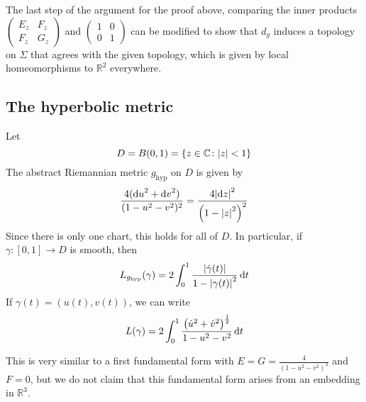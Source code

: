 \begin{remark}
	The last step of the argument for the proof above, comparing the inner products \( \begin{pmatrix}
		E_z & F_z \\
		F_z & G_z
	\end{pmatrix} \) and \( \begin{pmatrix}
		1 & 0 \\
		0 & 1
	\end{pmatrix} \) can be modified to show that \( d_g \) induces a topology on \( \Sigma \) that agrees with the given topology, which is given by local homeomorphisms to \( \mathbb R^2 \) everywhere.
\end{remark}

\subsection{The hyperbolic metric}
\begin{definition}
	Let
	\[ D = B(0,1) = \qty{z \in \mathbb C \colon \abs{z} < 1} \]
	The abstract Riemannian metric \( g_{\mathrm{hyp}} \) on \( D \) is given by
	\[ \frac{4(\dd{u}^2 + \dd{v}^2)}{(1-u^2-v^2)^2} = \frac{4 \abs{\dd{z}}^2}{\qty(1 - \abs{z}^2)^2} \]
	Since there is only one chart, this holds for all of \( D \).
	In particular, if \( \gamma \colon [0,1] \to D \) is smooth, then
	\[ L_{g_{\mathrm{hyp}}}(\gamma) = 2 \int_0^1 \frac{\abs{\dot\gamma(t)}}{1 - \abs{\gamma(t)}^2} \dd{t} \]
	If \( \gamma(t) = (u(t), v(t)) \), we can write
	\[ L(\gamma) = 2 \int_0^1 \frac{\qty(\dot u^2 + \dot v^2)^{\frac{1}{2}}}{1 - u^2 - v^2} \dd{t} \]
\end{definition}
This is very similar to a first fundamental form with \( E = G = \frac{4}{(1-u^2-v^2)^2} \) and \( F = 0 \), but we do not claim that this fundamental form arises from an embedding in \( \mathbb R^3 \).

